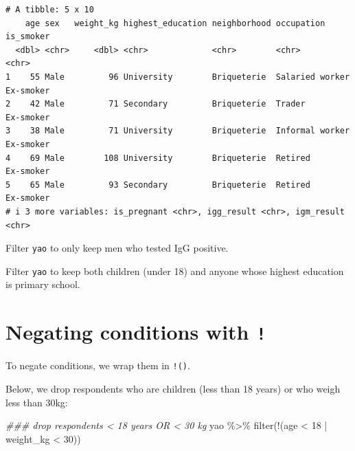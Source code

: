\documentclass[
  letterpaper,
  DIV=11,
  numbers=noendperiod]{scrreprt}
\newenvironment{Shaded}{\begin{snugshade}}{\end{snugshade}}
\newcommand{\DecValTok}[1]{\textcolor[rgb]{0.68,0.00,0.00}{#1}}
\newcommand{\DocumentationTok}[1]{\textcolor[rgb]{0.37,0.37,0.37}{\textit{#1}}}
\newcommand{\FunctionTok}[1]{\textcolor[rgb]{0.28,0.35,0.67}{#1}}
\newcommand{\NormalTok}[1]{\textcolor[rgb]{0.00,0.23,0.31}{#1}}
\newcommand{\SpecialCharTok}[1]{\textcolor[rgb]{0.37,0.37,0.37}{#1}}
\begin{document}
\begin{verbatim}
# A tibble: 5 x 10
    age sex   weight_kg highest_education neighborhood occupation      is_smoker
  <dbl> <chr>     <dbl> <chr>             <chr>        <chr>           <chr>    
1    55 Male         96 University        Briqueterie  Salaried worker Ex-smoker
2    42 Male         71 Secondary         Briqueterie  Trader          Ex-smoker
3    38 Male         71 University        Briqueterie  Informal worker Ex-smoker
4    69 Male        108 University        Briqueterie  Retired         Ex-smoker
5    65 Male         93 Secondary         Briqueterie  Retired         Ex-smoker
# i 3 more variables: is_pregnant <chr>, igg_result <chr>, igm_result <chr>
\end{verbatim}

\begin{tcolorbox}[enhanced jigsaw, title=\textcolor{quarto-callout-tip-color}{\faLightbulb}\hspace{0.5em}{Practice}, colbacktitle=quarto-callout-tip-color!10!white, leftrule=.75mm, arc=.35mm, opacityback=0, bottomrule=.15mm, rightrule=.15mm, toptitle=1mm, breakable, toprule=.15mm, colback=white, coltitle=black, colframe=quarto-callout-tip-color-frame, bottomtitle=1mm, titlerule=0mm, left=2mm, opacitybacktitle=0.6]

Filter \texttt{yao} to only keep men who tested IgG positive.

Filter \texttt{yao} to keep both children (under 18) and anyone whose
highest education is primary school.

\end{tcolorbox}

\section{\texorpdfstring{Negating conditions with
\texttt{!}}{Negating conditions with !}}\label{negating-conditions-with}

To negate conditions, we wrap them in \texttt{!()}.

Below, we drop respondents who are children (less than 18 years) or who
weigh less than 30kg:

\begin{Shaded}
\begin{Highlighting}[]
\DocumentationTok{\#\#\# drop respondents \textless{} 18 years OR \textless{} 30 kg}
\NormalTok{yao }\SpecialCharTok{\%\textgreater{}\%} \FunctionTok{filter}\NormalTok{(}\SpecialCharTok{!}\NormalTok{(age }\SpecialCharTok{\textless{}} \DecValTok{18} \SpecialCharTok{|}\NormalTok{ weight\_kg }\SpecialCharTok{\textless{}} \DecValTok{30}\NormalTok{))}
\end{Highlighting}
\end{Shaded}
\end{document}

